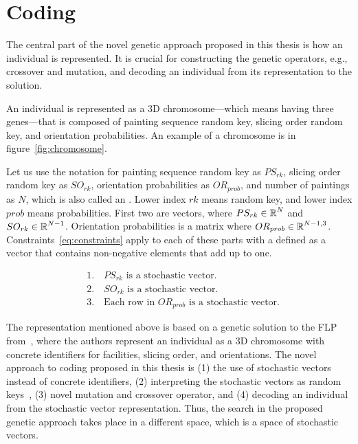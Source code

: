 \newpage
\section{Coding}\label{sec:coding}

The central part of the novel genetic approach proposed in this thesis is how an individual is represented.
It is crucial for constructing the genetic operators, e.g., crossover and mutation, and decoding an individual from its representation to the solution.

An individual is represented as a 3D chromosome—which means having three genes—that is composed of
painting sequence random key, slicing order random key, and orientation probabilities.
An example of a chromosome is in figure~\ref{fig:chromosome}.

Let us use the notation for painting sequence random key as $PS_{rk}$,
slicing order random key as $SO_{rk}$,
orientation probabilities as $OR_{prob}$, and number of paintings as $N$, which is also called an .
Lower index $rk$ means random key, and lower index $prob$ means probabilities.
First two are vectors, where $PS_{rk} \in \operatorname*{\mathbb{R}}^N$ and $SO_{rk} \in \operatorname*{\mathbb{R}}^{N-1}$.
Orientation probabilities is a matrix where $OR_{prob} \in \operatorname*{\mathbb{R}}^{N-1, 3}$.
Constraints~\ref{eq:constraints} apply to each of these parts with
a  defined as a vector that contains non-negative elements that add up to one.

\begin{equation}
    \begin{aligned}
        & 1. \quad PS_{rk} \text{ is a stochastic vector.} \\
        & 2. \quad SO_{rk} \text{ is a stochastic vector.} \\
        & 3. \quad \text{Each row in } OR_{prob} \text{ is a stochastic vector.}
    \end{aligned}\label{eq:constraints}
\end{equation}


The representation mentioned above is based on a genetic solution to the FLP
from~\cite{friedrichIntegratedSlicingTree2018, riponAdaptiveVariableNeighborhood2013},
where the authors represent an individual as a 3D chromosome with concrete identifiers for facilities, slicing order, and orientations.
The novel approach to coding proposed in this thesis is
(1) the use of stochastic vectors instead of concrete identifiers,
(2) interpreting the stochastic vectors as random keys~\cite{beanGeneticAlgorithmsRandom1994},
(3) novel mutation and crossover operator, and
(4) decoding an individual from the stochastic vector representation.
Thus, the search in the proposed genetic approach takes place in a different space, which is a space of stochastic vectors.


